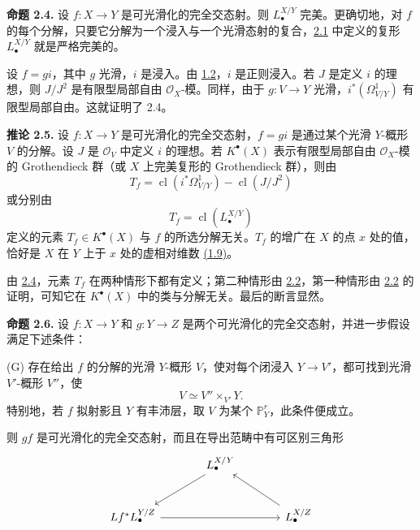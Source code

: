 \textbf{命题 2.4.} 设 $f:X\to Y$ 是可光滑化的完全交态射。则 $L^{X/Y}_\bullet$ 完美。更确切地，对 $f$ 的每个分解，只要它分解为一个浸入与一个光滑态射的复合，\hyperlink{sga6.e08.para.2-1}{2.1} 中定义的复形 $L^{X/Y}_\bullet$ 就是严格完美的。

设 $f=g i$，其中 $g$ 光滑，$i$ 是浸入。由 \hyperlink{sga6.e08.prop.1-2}{1.2}，$i$ 是正则浸入。若 $J$ 是定义 $i$ 的理想，则 $J/J^2$ 是有限型局部自由 $\mathcal O_X$-模。同样，由于 $g:V\to Y$ 光滑，$i^*(\Omega^1_{V/Y})$ 有限型局部自由。这就证明了 2.4。

\textbf{推论 2.5.} 设 $f:X\to Y$ 是可光滑化的完全交态射，$f=gi$ 是通过某个光滑 $Y$-概形 $V$ 的分解。设 $J$ 是 $\mathcal O_V$ 中定义 $i$ 的理想。若 $K^{\bullet}(X)$ 表示有限型局部自由 $\mathcal O_X$-模的 Grothendieck 群（或 $X$ 上完美复形的 Grothendieck 群），则由
\[
T_f=\operatorname{cl}(i^*\Omega^1_{V/Y})-\operatorname{cl}(J/J^2)
\]
或分别由
\[
T_f=\operatorname{cl}(L^{X/Y}_\bullet)
\]
定义的元素 $T_f\in K^{\bullet}(X)$ 与 $f$ 的所选分解无关。$T_f$ 的增广在 $X$ 的点 $x$ 处的值，恰好是 $X$ 在 $Y$ 上于 $x$ 处的虚相对维数 \hyperlink{sga6.e08.def.1-9}{(1.9)}。

由 \hyperlink{sga6.e08.prop.2-4}{2.4}，元素 $T_f$ 在两种情形下都有定义；第二种情形由 \hyperlink{sga6.e08.prop.2-2}{2.2}，第一种情形由 \hyperlink{sga6.e08.prop.2-2}{2.2} 的证明，可知它在 $K^{\bullet}(X)$ 中的类与分解无关。最后的断言显然。

\textbf{命题 2.6.} 设 $f:X\to Y$ 和 $g:Y\to Z$ 是两个可光滑化的完全交态射，并进一步假设满足下述条件：

(G) 存在给出 $f$ 的分解的光滑 $Y$-概形 $V$，使对每个闭浸入 $Y\to V'$，都可找到光滑 $V'$-概形 $V''$，使
\[
V \simeq V''\times_{V'}Y.
\]
特别地，若 $f$ 拟射影且 $Y$ 有丰沛层，取 $V$ 为某个 $\mathbb P^r_Y$，此条件便成立。

则 $gf$ 是可光滑化的完全交态射，而且在导出范畴中有可区别三角形
\[
\begin{tikzcd}[column sep=large,row sep=large]
& L^{X/Y}_\bullet \arrow[dl] \\
Lf^*L^{Y/Z}_\bullet \arrow[rr] && L^{X/Z}_\bullet \arrow[ul]
\end{tikzcd}
\]


